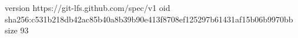 version https://git-lfs.github.com/spec/v1
oid sha256:c531b218db42ac85b40a8b39b90e413f8708ef125297b61431af15b06b9970bb
size 93
